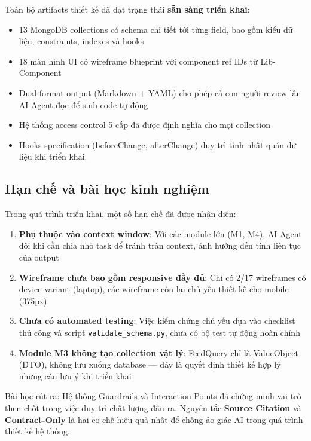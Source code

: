 \documentclass[13pt,a4paper,oneside]{extreport}
\numberwithin{equation}{chapter}
\numberwithin{figure}{chapter}
\numberwithin{table}{chapter}
\begin{document}
Toàn bộ artifacts thiết kế đã đạt trạng thái \textbf{sẵn sàng triển khai}:

\begin{itemize}
    \item 13 MongoDB collections có schema chi tiết tới từng field, bao gồm kiểu dữ liệu, constraints, indexes và hooks
    \item 18 màn hình UI có wireframe blueprint với component ref IDs từ Lib-Component
    \item Dual-format output (Markdown + YAML) cho phép cả con người review lẫn AI Agent đọc để sinh code tự động
    \item Hệ thống access control 5 cấp đã được định nghĩa cho mọi collection
    \item Hooks specification (beforeChange, afterChange) duy trì tính nhất quán dữ liệu khi triển khai.
\end{itemize}

\subsection{Hạn chế và bài học kinh nghiệm}

Trong quá trình triển khai, một số hạn chế đã được nhận diện:

\begin{enumerate}
    \item \textbf{Phụ thuộc vào context window}: Với các module lớn (M1, M4), AI Agent đôi khi cần chia nhỏ task để tránh tràn context, ảnh hưởng đến tính liên tục của output
    \item \textbf{Wireframe chưa bao gồm responsive đầy đủ}: Chỉ có 2/17 wireframes có device variant (laptop), các wireframe còn lại chủ yếu thiết kế cho mobile (375px)
    \item \textbf{Chưa có automated testing}: Việc kiểm chứng chủ yếu dựa vào checklist thủ công và script \texttt{validate\_schema.py}, chưa có bộ test tự động hoàn chỉnh
    \item \textbf{Module M3 không tạo collection vật lý}: FeedQuery chỉ là ValueObject (DTO), không lưu xuống database — đây là quyết định thiết kế hợp lý nhưng cần lưu ý khi triển khai
\end{enumerate}

Bài học rút ra: Hệ thống Guardrails và Interaction Points đã chứng minh vai trò then chốt trong việc duy trì chất lượng đầu ra. Nguyên tắc \textbf{Source Citation} và \textbf{Contract-Only} là hai cơ chế hiệu quả nhất để chống ảo giác AI trong quá trình thiết kế hệ thống.
\end{document}
